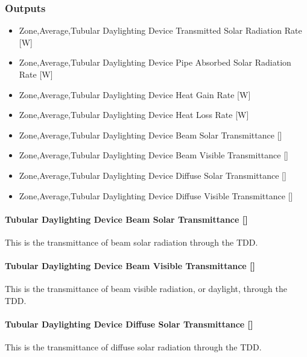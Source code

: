 \subsubsection{Outputs}\label{outputs-2-004}

\begin{itemize}
\item
  Zone,Average,Tubular Daylighting Device Transmitted Solar Radiation Rate {[}W{]}
\item
  Zone,Average,Tubular Daylighting Device Pipe Absorbed Solar Radiation Rate {[}W{]}
\item
  Zone,Average,Tubular Daylighting Device Heat Gain Rate {[}W{]}
\item
  Zone,Average,Tubular Daylighting Device Heat Loss Rate {[}W{]}
\item
  Zone,Average,Tubular Daylighting Device Beam Solar Transmittance {[]}
\item
  Zone,Average,Tubular Daylighting Device Beam Visible Transmittance {[]}
\item
  Zone,Average,Tubular Daylighting Device Diffuse Solar Transmittance {[]}
\item
  Zone,Average,Tubular Daylighting Device Diffuse Visible Transmittance {[]}
\end{itemize}

\paragraph{Tubular Daylighting Device Beam Solar Transmittance {[]}}\label{tubular-daylighting-device-beam-solar-transmittance}

This is the transmittance of beam solar radiation through the TDD.

\paragraph{Tubular Daylighting Device Beam Visible Transmittance {[]}}\label{tubular-daylighting-device-beam-visible-transmittance}

This is the transmittance of beam visible radiation, or daylight, through the TDD.

\paragraph{Tubular Daylighting Device Diffuse Solar Transmittance {[]}}\label{tubular-daylighting-device-diffuse-solar-transmittance}

This is the transmittance of diffuse solar radiation through the TDD.

